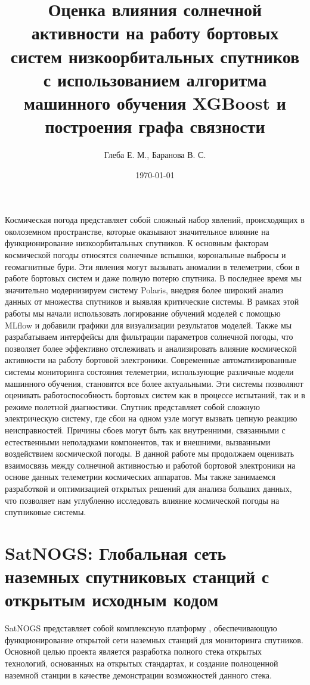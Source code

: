 \documentclass[14pt, a4paper]{src/bsu}
\title{Оценка влияния солнечной
активности на работу бортовых
систем низкоорбитальных
спутников с использованием
алгоритма машинного обучения
XGBoost и построения графа
связности}
\author{Глеба Е. М., Баранова В. С.}
\date{\today}
\begin{document}

Космическая погода представляет собой сложный набор явлений, происходящих в
околоземном пространстве, которые оказывают значительное влияние на
функционирование низкоорбитальных спутников. К основным факторам космической
погоды относятся солнечные вспышки, корональные выбросы и геомагнитные бури.
Эти явления могут вызывать аномалии в телеметрии, сбои в работе бортовых систем
и даже полную потерю спутника. В последнее время мы значительно модернизируем
систему Polaris, внедряя более широкий анализ данных от множества спутников и
выявляя критические системы. В рамках этой работы мы начали использовать
логирование обучений моделей с помощью MLflow и добавили графики для
визуализации результатов моделей. Также мы разрабатываем интерфейсы для
фильтрации параметров солнечной погоды, что позволяет более эффективно
отслеживать и анализировать влияние космической активности на работу бортовой
электроники. Современные автоматизированные системы мониторинга состояния
телеметрии, использующие различные модели машинного обучения, становятся все
более актуальными. Эти системы позволяют оценивать работоспособность бортовых
систем как в процессе испытаний, так и в режиме полетной диагностики. Спутник
представляет собой сложную электрическую систему, где сбои на одном узле могут
вызвать цепную реакцию неисправностей. Причины сбоев могут быть как
внутренними, связанными с естественными неполадками компонентов, так и
внешними, вызванными воздействием космической погоды. В данной работе мы
продолжаем оценивать взаимосвязь между солнечной активностью и работой бортовой
электроники на основе данных телеметрии космических аппаратов. Мы также
занимаемся разработкой и оптимизацией открытых решений для анализа больших
данных, что позволяет нам углубленно исследовать влияние космической погоды на
спутниковые системы.

\newpage

\chapter{SatNOGS: Глобальная сеть наземных спутниковых станций с открытым исходным кодом}



SatNOGS представляет собой комплексную платформу \cite{satnogs_general_docs},
обеспечивающую функционирование открытой сети наземных станций для мониторинга
спутников. Основной целью проекта является разработка полного стека открытых
технологий, основанных на открытых стандартах, и создание полноценной наземной
станции в качестве демонстрации возможностей данного стека.
\end{document}
